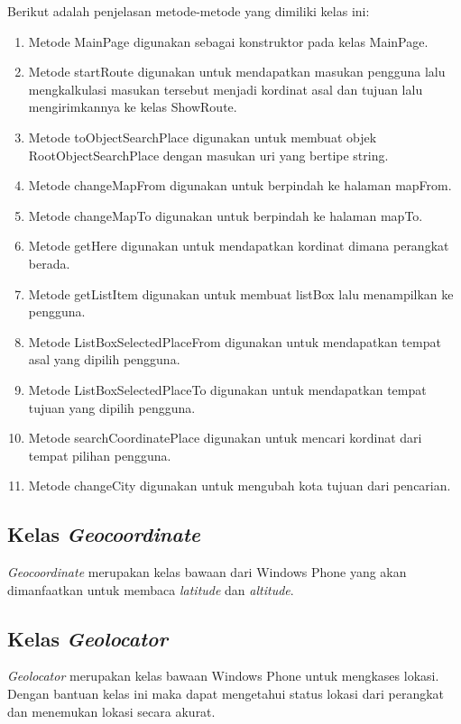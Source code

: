 Berikut adalah penjelasan metode-metode yang dimiliki kelas ini:
\begin{enumerate}
	\item Metode MainPage digunakan sebagai konstruktor pada kelas MainPage. 
	\item Metode startRoute digunakan untuk mendapatkan masukan pengguna lalu mengkalkulasi masukan tersebut menjadi kordinat asal dan tujuan lalu mengirimkannya ke kelas ShowRoute.
	\item Metode toObjectSearchPlace digunakan untuk membuat objek RootObjectSearchPlace dengan masukan uri yang bertipe string.
	\item Metode changeMapFrom digunakan untuk berpindah ke halaman mapFrom.
	\item Metode changeMapTo digunakan untuk berpindah ke halaman mapTo.
	\item Metode getHere digunakan untuk mendapatkan kordinat dimana perangkat berada.
	\item Metode getListItem digunakan untuk membuat listBox lalu menampilkan ke pengguna. 
	\item Metode ListBoxSelectedPlaceFrom digunakan untuk mendapatkan tempat asal yang dipilih pengguna.
	\item Metode ListBoxSelectedPlaceTo digunakan untuk mendapatkan tempat tujuan yang dipilih pengguna.
	\item Metode searchCoordinatePlace digunakan untuk mencari kordinat dari tempat pilihan pengguna.
	\item Metode changeCity digunakan untuk mengubah kota tujuan dari pencarian.
\end{enumerate}

\subsection{Kelas \textit{Geocoordinate}}
\label{lab:Kelas Geocoordinate}
\hspace{0.5cm} \textit{Geocoordinate} merupakan kelas bawaan dari Windows Phone yang akan dimanfaatkan untuk membaca \textit{latitude} dan \textit{altitude}.

\subsection{Kelas \textit{Geolocator}}
\label{lab:Kelas Geolocator}
\hspace{0.5cm} \textit{Geolocator} merupakan kelas bawaan Windows Phone untuk mengkases lokasi. Dengan bantuan kelas ini maka dapat mengetahui status lokasi dari perangkat dan menemukan lokasi secara akurat.

